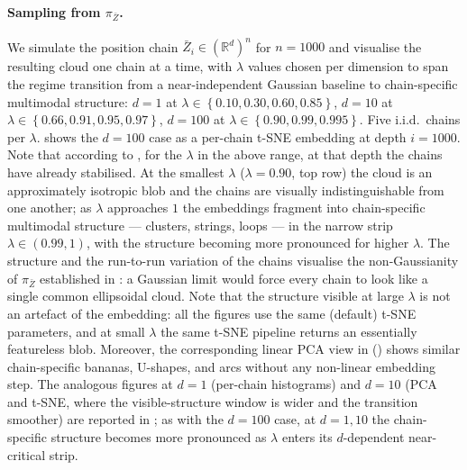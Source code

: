 \documentclass{article}
\newcommand{\RR}{\mathbb{R}}
\newcommand{\Set}[1]{\left\{ #1 \right\}}
\newcommand{\bZ}{\bar{Z}}
\begin{document}
\paragraph{Sampling from $\pi_{\bZ}$.}
We simulate the position chain $\bZ_i \in (\RR^d)^n$ for $n = 1000$ and visualise the resulting cloud one chain at a time, with $\lambda$ values chosen per dimension to span the regime transition from a near-independent Gaussian baseline to chain-specific multimodal structure: $d = 1$ at $\lambda \in \Set{0.10, 0.30, 0.60, 0.85}$, $d = 10$ at $\lambda \in \Set{0.66, 0.91, 0.95, 0.97}$, $d = 100$ at $\lambda \in \Set{0.90, 0.99, 0.995}$. Five i.i.d.\ chains per $\lambda$.  shows the $d = 100$ case as a per-chain t-SNE embedding at depth $i = 1000$. Note that according to , for the $\lambda$ in the above range, at that depth the chains have already stabilised. At the smallest $\lambda$ ($\lambda = 0.90$, top row) the cloud is an approximately isotropic blob and the chains are visually indistinguishable from one another; as $\lambda$ approaches $1$ the embeddings fragment into chain-specific multimodal structure --- clusters, strings, loops --- in the narrow strip $\lambda \in (0.99, 1)$, with the structure becoming more pronounced for higher $\lambda$. The structure and the run-to-run variation of the chains visualise the non-Gaussianity of $\pi_{\bZ}$ established in : a Gaussian limit would force every chain to look like a single common ellipsoidal cloud. Note that the structure visible at large $\lambda$ is not an artefact of the embedding: all the figures use the same (default) t-SNE parameters, and at small $\lambda$ the same t-SNE pipeline returns an essentially featureless blob. Moreover, the corresponding linear PCA view in  () shows similar chain-specific bananas, U-shapes, and arcs without any non-linear embedding step. The analogous figures at $d = 1$ (per-chain histograms) and $d = 10$ (PCA and t-SNE, where the visible-structure window is wider and the transition smoother) are reported in ; as with the $d = 100$ case, at $d = 1, 10$ the chain-specific structure becomes more pronounced as $\lambda$ enters its $d$-dependent near-critical strip.
\end{document}

